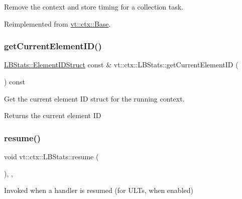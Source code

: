 Remove the context and store timing for a collection task. 



Reimplemented from \hyperlink{structvt_1_1ctx_1_1_base_a113bac732b2831caa8eed11609ccaf0e}{vt\+::ctx\+::\+Base}.

\mbox{\label{structvt_1_1ctx_1_1_l_b_stats_acfcb5bb3b554fa1992525ec04d46b69e}} 
\subsubsection{\texorpdfstring{get\+Current\+Element\+I\+D()}{getCurrentElementID()}}
{\footnotesize\ttfamily \hyperlink{structvt_1_1ctx_1_1_l_b_stats_a9806d27212bffbbac72eb1e05f9e9880}{L\+B\+Stats\+::\+Element\+I\+D\+Struct} const  \& vt\+::ctx\+::\+L\+B\+Stats\+::get\+Current\+Element\+ID (\begin{DoxyParamCaption}{ }\end{DoxyParamCaption}) const}



Get the current element ID struct for the running context. 

\begin{DoxyReturn}{Returns}
the current element ID 
\end{DoxyReturn}
\mbox{\label{structvt_1_1ctx_1_1_l_b_stats_a099850f1bd53aafe650ed9e3958ca54b}} 
\subsubsection{\texorpdfstring{resume()}{resume()}}
{\footnotesize\ttfamily void vt\+::ctx\+::\+L\+B\+Stats\+::resume (\begin{DoxyParamCaption}{ }\end{DoxyParamCaption})\hspace{0.3cm}{\ttfamily [final]}, {\ttfamily [override]}, {\ttfamily [virtual]}}



Invoked when a handler is resumed (for U\+L\+Ts, when enabled) 



